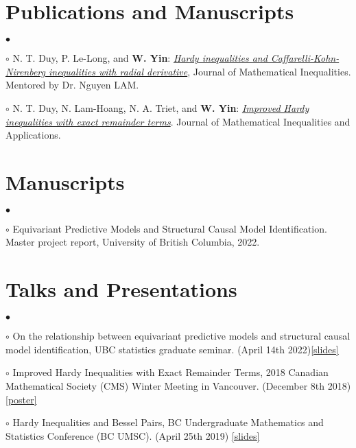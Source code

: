 \documentclass[margin,line]{res}
\newenvironment{list2}{
  \begin{list}{$\bullet$}{%
      \setlength{\itemsep}{0in}
      \setlength{\parsep}{0in} \setlength{\parskip}{0in}
      \setlength{\topsep}{0in} \setlength{\partopsep}{0in}
      \setlength{\leftmargin}{0.2in}}}{\end{list}}
\begin{document}
\begin{resume}
\section{\sc Publications and Manuscripts}\begin{list2}
\item[$\circ$]N. T. Duy, P. Le-Long, and \textbf{W. Yin}: \href{http://jmi.ele-math.com/14-32/Hardy-inequalities-and-Caffarelli-Kohn-Nirenberg-inequalities-with-radial-derivative}{\textit{Hardy inequalities and Caffarelli-Kohn-Nirenberg inequalities with radial derivative}}, Journal of Mathematical Inequalities. Mentored by Dr. Nguyen LAM. 
\item[$\circ$]N. T. Duy, N. Lam-Hoang, N. A. Triet, and \textbf{W. Yin}:
\href{http://mia.ele-math.com/23-93/Improved-Hardy-inequalities-with-exact-remainder-terms}{\textit{Improved Hardy inequalities with exact remainder terms}}. Journal of Mathematical Inequalities and Applications. 
\end{list2}

\section{\sc Manuscripts}\begin{list2}
\item[$\circ$]Equivariant Predictive Models and Structural Causal Model Identification. Master project report, University of British Columbia, 2022.
\end{list2}
\section{\sc Talks and Presentations}
\begin{list2}
\item[$\circ$]
{On the relationship between equivariant predictive models and structural causal model identification}, UBC statistics graduate seminar. (April 14th 2022)\href{https://github.com/graceyin06/invariant-model/blob/main/master_slide-18.pdf}{[slides]}
\item[$\circ$]
{Improved Hardy Inequalities with Exact Remainder Terms}, 2018 Canadian Mathematical Society (CMS) Winter Meeting in Vancouver. (December 8th 2018)\href{https://graceyin06.github.io/Hardy-Inequalities-Talks/poster_for_CMS.pdf}{[poster]}
\item[$\circ$]
{Hardy Inequalities and Bessel Pairs}, BC Undergraduate Mathematics and Statistics Conference (BC UMSC). (April 25th 2019)
\href{https://graceyin06.github.io/Hardy-Inequalities-Talks/BC_UMSC_Slides.pdf}{[slides]}
\end{list2}



\end{resume}
\end{document}
